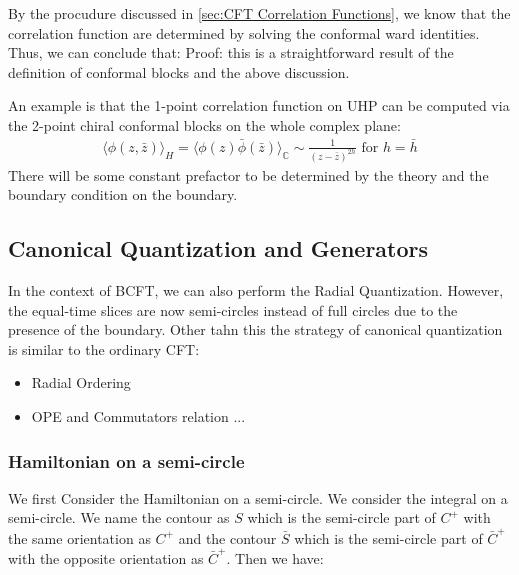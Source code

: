 By the procudure discussed in \cref{sec:CFT Correlation Functions}, we know that the correlation function are determined by solving the conformal ward identities. Thus, we can conclude that:
Proof: this is a straightforward result of the definition of conformal blocks and the above discussion.

An example is that the 1-point correlation function on UHP can be computed via the 2-point chiral conformal blocks on the whole complex plane:
\begin{align}
  \langle \phi(z,\bar{z}) \rangle_{H} = \langle \phi(z) \bar{\phi}(\bar{z}) \rangle_{\mathbb{C}} \sim \frac{1}{(z - \bar{z})^{2h}} \text{ for } h = \bar{h}
\end{align}
There will be some constant prefactor to be determined by the theory and the boundary condition on the boundary.


\subsection{Canonical Quantization and Generators}

In the context of BCFT, we can also perform the Radial Quantization. However, the equal-time slices are now semi-circles instead of full circles due to the presence of the boundary. Other tahn this the strategy of canonical quantization is similar to the ordinary CFT:
\begin{itemize}
  \item Radial Ordering
  \item OPE and Commutators relation
    ...
\end{itemize}

\subsubsection{Hamiltonian on a semi-circle}
We first Consider the Hamiltonian on a semi-circle. We consider the integral on a semi-circle. We name the contour as $ S $ which is the semi-circle part of $ C^+ $ with the same orientation as $ C^+ $ and the contour $ \bar{S} $ which is the semi-circle part of $ \bar{C}^+ $ with the opposite orientation as $ \bar{C}^+ $. Then we have:

